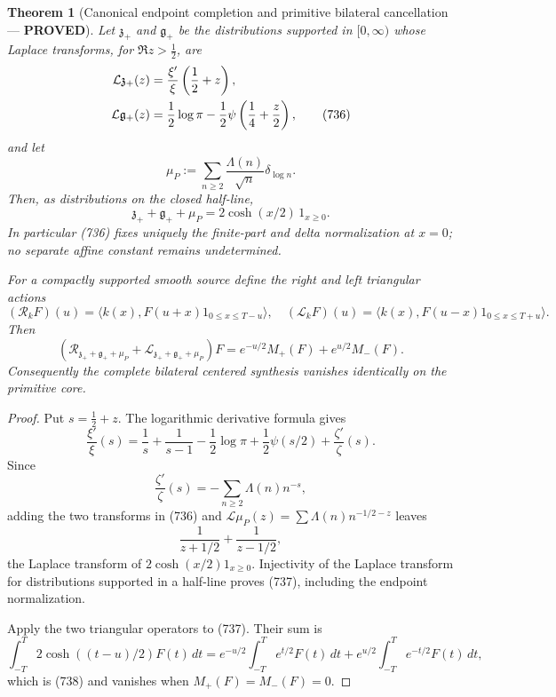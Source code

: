 \documentclass[11pt]{article}
\newtheorem{theorem}{Theorem}
\newcommand{\PROVED}{\textcolor{green!45!black}{\textbf{PROVED}}}
\begin{document}
\begin{theorem}[Canonical endpoint completion and primitive bilateral
cancellation --- \PROVED]
Let \(\mathfrak z_+\) and \(\mathfrak g_+\) be the distributions supported
in \([0,\infty)\) whose Laplace transforms, for \(\Re z>\frac12\), are
\begin{align}
 \mathcal L\mathfrak z_+(z)
 &=\frac{\xi'}{\xi}\left(\frac12+z\right),\notag\\
 \mathcal L\mathfrak g_+(z)
 &=\frac12\log\pi-\frac12
   \psi\left(\frac14+\frac z2\right),                \tag{736}
\end{align}
and let
\[
 \mu_P:=\sum_{n\ge2}\frac{\Lambda(n)}{\sqrt n}
                  \delta_{\log n}.
\]
Then, as distributions on the closed half-line,
\begin{equation}
 \boxed{\mathfrak z_++\mathfrak g_++\mu_P
        =2\cosh(x/2)\,1_{x\ge0}.}                   \tag{737}
\end{equation}
In particular (736) fixes uniquely the finite-part and delta normalization
at \(x=0\); no separate affine constant remains undetermined.

For a compactly supported smooth source define the right and left
triangular actions
\[
 (\mathcal R_kF)(u)=\langle k(x),F(u+x)1_{0\le x\le T-u}\rangle,
\quad
 (\mathcal L_kF)(u)=\langle k(x),F(u-x)1_{0\le x\le T+u}\rangle.
\]
Then
\begin{equation}
 (\mathcal R_{\mathfrak z_++\mathfrak g_++\mu_P}
 +\mathcal L_{\mathfrak z_++\mathfrak g_++\mu_P})F
 =
 e^{-u/2}M_+(F)+e^{u/2}M_-(F).                     \tag{738}
\end{equation}
Consequently the complete bilateral centered synthesis vanishes identically
on the primitive core.
\end{theorem}

\begin{proof}
Put \(s=\frac12+z\).  The logarithmic derivative formula gives
\[
 \frac{\xi'}{\xi}(s)
 =\frac1s+\frac1{s-1}-\frac12\log\pi
  +\frac12\psi(s/2)+\frac{\zeta'}{\zeta}(s).
\]
Since
\[
 \frac{\zeta'}{\zeta}(s)
 =-\sum_{n\ge2}\Lambda(n)n^{-s},
\]
adding the two transforms in (736) and
\(\mathcal L\mu_P(z)=\sum\Lambda(n)n^{-1/2-z}\) leaves
\[
 \frac1{z+1/2}+\frac1{z-1/2},
\]
the Laplace transform of \(2\cosh(x/2)1_{x\ge0}\).  Injectivity of the
Laplace transform for distributions supported in a half-line proves (737),
including the endpoint normalization.

Apply the two triangular operators to (737).  Their sum is
\[
 \int_{-T}^{T}2\cosh((t-u)/2)F(t)\,dt
 =e^{-u/2}\int_{-T}^{T}e^{t/2}F(t)\,dt
  +e^{u/2}\int_{-T}^{T}e^{-t/2}F(t)\,dt,
\]
which is (738) and vanishes when \(M_+(F)=M_-(F)=0\).
\end{proof}
\end{document}
